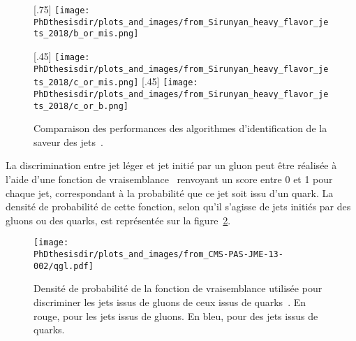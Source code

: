 \begin{figure}[p]
\centering

[.75\textwidth]
{\texttt{[image: \\PhDthesisdir/plots\_and\_images/from\_Sirunyan\_heavy\_flavor\_jets\_2018/b\_or\_mis.png]}}

\vspace{\baselineskip}

[.45\textwidth]
{\texttt{[image: \\PhDthesisdir/plots\_and\_images/from\_Sirunyan\_heavy\_flavor\_jets\_2018/c\_or\_mis.png]}}
\hfill
{}[.45\textwidth]
{\texttt{[image: \\PhDthesisdir/plots\_and\_images/from\_Sirunyan\_heavy\_flavor\_jets\_2018/c\_or\_b.png]}}

\caption[Performances des algorithmes d'identification de la saveur des jets.]{Comparaison des performances des algorithmes d'identification de la saveur des jets~\cite{Sirunyan_heavy_flavor_jets_2018}.}
\label{fig-chapter-JERC-section-jets_reco-subsec-flavor-bc_tag_roc_curves}
\end{figure}
\par La discrimination entre jet léger et jet initié par un gluon peut être réalisée à l'aide d'une fonction de vraisemblance~\cite{CMS-PAS-JME-13-002} renvoyant un score entre 0 et 1 pour chaque jet, correspondant à la probabilité que ce jet soit issu d'un quark. La densité de probabilité de cette fonction, selon qu'il s'agisse de jets initiés par des gluons ou des quarks, est représentée sur la figure~\ref{fig-chapter-JERC-section-jets_reco-subsec-flavor-qgl_likelihood}.
\begin{figure}[p]
\centering
\texttt{[image: \\PhDthesisdir/plots\_and\_images/from\_CMS-PAS-JME-13-002/qgl.pdf]}
\caption[Performances de la discrimation quark-gluon pour la saveur des jets.]{Densité de probabilité de la fonction de vraisemblance utilisée pour discriminer les jets issus de gluons de ceux issus de quarks~\cite{CMS-PAS-JME-13-002}. En rouge, pour les jets issus de gluons. En bleu, pour des jets issus de quarks.}
\label{fig-chapter-JERC-section-jets_reco-subsec-flavor-qgl_likelihood}
\end{figure}
